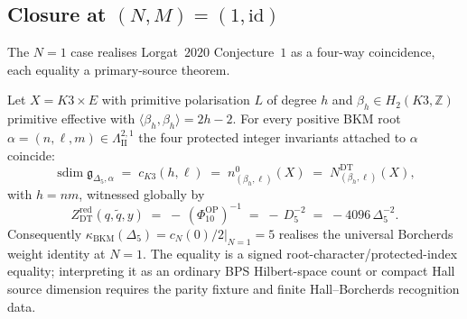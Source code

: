 \subsection{Closure at \texorpdfstring{$(N, M) = (1, \mathrm{id})$}{(N, M) = (1, id)}}
\label{subsec:k3e-lorgat-conj1-N1}

The $N = 1$ case realises Lorgat~$2020$ Conjecture~$1$ as a four-way coincidence, each equality a primary-source theorem.

\begin{theorem}[Lorgat~\texorpdfstring{$2020$}{2020} Conjecture~\texorpdfstring{$1$}{1} at \texorpdfstring{$(N, M) = (1, \mathrm{id})$}{(N, M) = (1, id)}]
\label{thm:lorgat-conj1-N1-complete}
Let $X = K3 \times E$ with primitive polarisation $L$ of degree $h$ and $\beta_h \in H_2(K3, \mathbb{Z})$ primitive effective with $\langle \beta_h, \beta_h \rangle = 2h - 2$. For every positive BKM root $\alpha = (n, \ell, m) \in \Lambda^{2, 1}_{\mathrm{II}}$ the four protected integer invariants attached to $\alpha$ coincide:
\begin{equation}
\label{eq:four-way-mult-N1}
\operatorname{sdim}\mathfrak g_{\Delta_5,\alpha} \;=\; c_{K3}(h, \ell) \;=\; n^{0}_{(\beta_h, \ell)}(X) \;=\; N^{\mathrm{DT}}_{(\beta_h, \ell)}(X),
\end{equation}
with $h = nm$, witnessed globally by
\begin{equation}
\label{eq:OP-igusa-N1}
Z^{\mathrm{red}}_{\mathrm{DT}}(q, \tilde q, y)
\;=\;
-\,(\Phi_{10}^{\mathrm{OP}})^{-1}
\;=\;
-\,D_5^{-2}
\;=\;
-4096\,\Delta_5^{-2}.
\end{equation}
Consequently $\kappa_{\mathrm{BKM}}(\Delta_5) = \left.c_N(0)/2\right|_{N=1} = 5$ realises the universal Borcherds weight identity at $N = 1$. The equality is a signed root-character/protected-index equality; interpreting it as an ordinary BPS Hilbert-space count or compact Hall source dimension requires the parity fixture and finite Hall--Borcherds recognition data.
\end{theorem}

